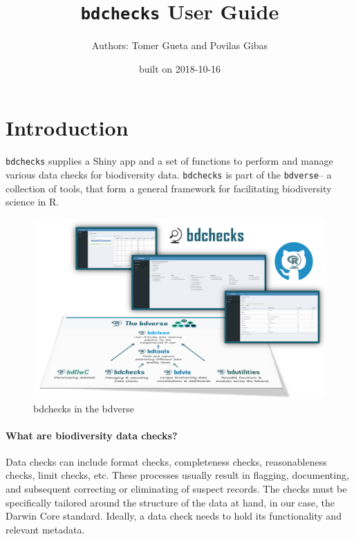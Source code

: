 \documentclass[]{book}
\title{\texttt{bdchecks} User Guide}
\author{Authors: Tomer Gueta and Povilas Gibas}
\date{built on 2018-10-16}
\theoremstyle{definition}
\theoremstyle{definition}
\theoremstyle{definition}
\theoremstyle{remark}
\begin{document}
\maketitle

{
\setcounter{tocdepth}{1}
\tableofcontents
}
\chapter*{Introduction}\label{introduction}

\texttt{bdchecks} supplies a Shiny app and a set of functions to perform
and manage various data checks for biodiversity data. \texttt{bdchecks}
is part of the \texttt{bdverse}-- a collection of tools, that form a
general framework for facilitating biodiversity science in R.

\begin{figure}
\centering
\includegraphics{img/bdchecks_bdverse.png}
\caption{bdchecks in the bdverse}
\end{figure}

\subsubsection*{What are biodiversity data
checks?}\label{what-are-biodiversity-data-checks}

Data checks can include format checks, completeness checks,
reasonableness checks, limit checks, etc. These processes usually result
in flagging, documenting, and subsequent correcting or eliminating of
suspect records. The checks must be specifically tailored around the
structure of the data at hand, in our case, the Darwin Core standard.
Ideally, a data check needs to hold its functionality and relevant
metadata.
\end{document}
